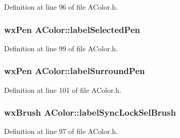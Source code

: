 Definition at line 96 of file A\+Color.\+h.

\subsubsection[{\texorpdfstring{label\+Selected\+Pen}{labelSelectedPen}}]{\setlength{\rightskip}{0pt plus 5cm}wx\+Pen A\+Color\+::label\+Selected\+Pen\hspace{0.3cm}{\ttfamily [static]}}\hypertarget{class_a_color_a9ca02150c98cdbf59c466c44902e9eca}{}\label{class_a_color_a9ca02150c98cdbf59c466c44902e9eca}


Definition at line 99 of file A\+Color.\+h.

\subsubsection[{\texorpdfstring{label\+Surround\+Pen}{labelSurroundPen}}]{\setlength{\rightskip}{0pt plus 5cm}wx\+Pen A\+Color\+::label\+Surround\+Pen\hspace{0.3cm}{\ttfamily [static]}}\hypertarget{class_a_color_a51810ca58729b5c17e07f8aedca690fc}{}\label{class_a_color_a51810ca58729b5c17e07f8aedca690fc}


Definition at line 101 of file A\+Color.\+h.

\subsubsection[{\texorpdfstring{label\+Sync\+Lock\+Sel\+Brush}{labelSyncLockSelBrush}}]{\setlength{\rightskip}{0pt plus 5cm}wx\+Brush A\+Color\+::label\+Sync\+Lock\+Sel\+Brush\hspace{0.3cm}{\ttfamily [static]}}\hypertarget{class_a_color_a96e75446438acc86828661c456756566}{}\label{class_a_color_a96e75446438acc86828661c456756566}


Definition at line 97 of file A\+Color.\+h.

